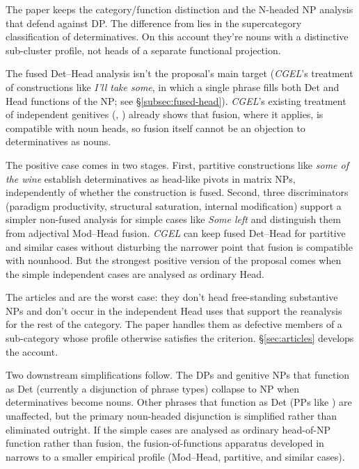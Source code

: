 \documentclass[12pt]{article}
\begin{document}
The paper keeps the category/function distinction and the N-headed NP analysis that \textcite{pullummiller2022nps} defend against DP. The difference from \textcite{abney1987} lies in the supercategory classification of determinatives. On this account they're nouns with a distinctive sub-cluster profile, not heads of a separate functional projection.

The fused Det--Head analysis isn't the proposal's main target (\textit{CGEL}'s treatment of constructions like \textit{I'll take some}, in which a single phrase fills both Det and Head functions of the NP; see §\ref{subsec:fused-head}). \textit{CGEL}'s existing treatment of independent genitives (, ) already shows that fusion, where it applies, is compatible with noun heads, so fusion itself cannot be an objection to determinatives as nouns.

The positive case comes in two stages. First, partitive constructions like \textit{some of the wine} establish determinatives as head-like pivots in matrix NPs, independently of whether the construction is fused. Second, three discriminators (paradigm productivity, structural saturation, internal modification) support a simpler non-fused analysis for simple cases like \textit{Some left} and distinguish them from adjectival Mod--Head fusion. \textit{CGEL} can keep fused Det--Head for partitive and similar cases without disturbing the narrower point that fusion is compatible with nounhood. But the strongest positive version of the proposal comes when the simple independent cases are analysed as ordinary Head.

The articles  and  are the worst case: they don't head free-standing substantive NPs and don't occur in the independent Head uses that support the reanalysis for the rest of the category. The paper handles them as defective members of a sub-category whose profile otherwise satisfies the criterion. §\ref{sec:articles} develops the account.

Two downstream simplifications follow. The DPs and genitive NPs that function as Det (currently a disjunction of phrase types) collapse to NP when determinatives become nouns. Other phrases that function as Det (PPs like ) are unaffected, but the primary noun-headed disjunction is simplified rather than eliminated outright. If the simple cases are analysed as ordinary head-of-NP function rather than fusion, the fusion-of-functions apparatus developed in \textcite{Payne2007} narrows to a smaller empirical profile (Mod--Head, partitive, and similar cases).
\end{document}
